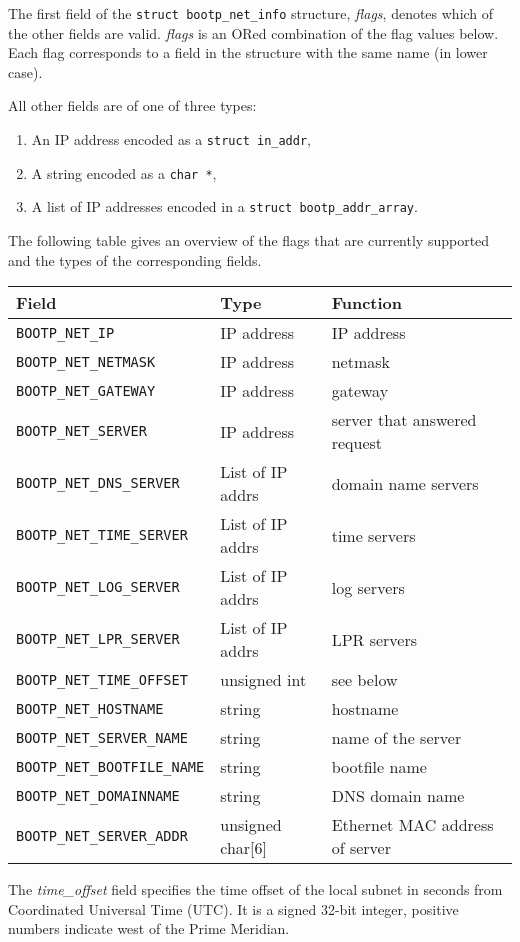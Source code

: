 \begin{apidesc}
	The first field of the \texttt{struct bootp_net_info} structure, 
	\emph{flags},
	denotes which of the other fields are valid.
	\emph{flags} is an ORed combination of the flag values below.
	Each flag corresponds to a field in the structure
	with the same name (in lower case).

	All other fields are of one of three types:
	\begin{enumerate}
	\item An IP address encoded as a 
		\texttt{struct in_addr},
	\item A string encoded as a \texttt{char *},
	\item A list of IP addresses encoded in a
		\texttt{struct bootp_addr_array}.
	\end{enumerate}

	The following table gives an overview of the flags that
	are currently supported and the types of the corresponding
	fields.

	\begin{tabular}{|l|l|l|}
	\hline
	Field & Type & Function \\
	\hline
	\texttt{BOOTP_NET_IP}		& IP address & IP address \\
	\texttt{BOOTP_NET_NETMASK}	& IP address & netmask \\
	\texttt{BOOTP_NET_GATEWAY}	& IP address & gateway \\
	\texttt{BOOTP_NET_SERVER}	& IP address & 
		server that answered \bootp{} request \\
	\texttt{BOOTP_NET_DNS_SERVER}	& List of IP addrs &
		domain name servers \\
	\texttt{BOOTP_NET_TIME_SERVER}	& List of IP addrs &
		time servers \\
	\texttt{BOOTP_NET_LOG_SERVER}	& List of IP addrs &
		log servers \\
	\texttt{BOOTP_NET_LPR_SERVER}	& List of IP addrs &
		LPR servers \\
	\texttt{BOOTP_NET_TIME_OFFSET}	& unsigned int & see below \\
	\texttt{BOOTP_NET_HOSTNAME}	& string & hostname \\
	\texttt{BOOTP_NET_SERVER_NAME}	& string & 
		name of the \bootp{} server \\
	\texttt{BOOTP_NET_BOOTFILE_NAME}& string &
		bootfile name \\
	\texttt{BOOTP_NET_DOMAINNAME}	& string &
		DNS domain name \\
	\texttt{BOOTP_NET_SERVER_ADDR}  & unsigned char[6] &
		Ethernet MAC address of \bootp{} server \\
	\hline
	\end{tabular}

	The \emph{time_offset} field
	specifies the time offset of the local subnet in seconds
	from Coordinated Universal Time (UTC). 
	It is a signed 32-bit integer,
        positive numbers indicate west of the Prime Meridian.
\end{apidesc}


